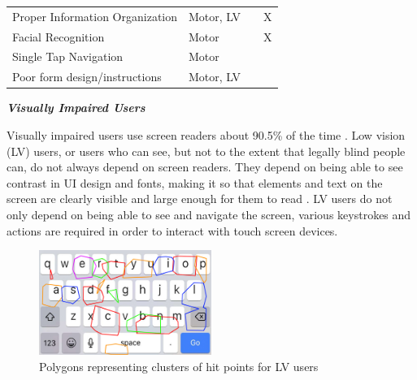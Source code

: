 \begin{table}[h]
\begin{tabular}{>{\centering\arraybackslash}p{2in}|>{\centering\arraybackslash}p{1.8in}|>{\centering\arraybackslash}p{.82in}|>{\centering\arraybackslash}p{.82in}}
		 Proper Information Organization & \footnotesize {Motor, LV} & \cite{Calvo16} & X \\
		\rowcolor{gray!30!} Facial Recognition & \footnotesize {Motor} & \cite{Calvo16, Astler11} & X \\
		 Single Tap Navigation & \footnotesize {Motor} & \cite{AppleAccess, GoogleAccess, HarvardAccess, WebGuide, FlrezAristizbal19, Milne18} &  \\
		\rowcolor{gray!30!} Poor form design/instructions & \footnotesize {Motor, LV} & \cite{ADAWeb, AccessGov} &  
		\end{tabular}
\vspace{-1em}
	\label{tab:guidelines}
\end{table}



\noindent \textbf{\textit{Visually Impaired Users}}

Visually impaired users use screen readers about 90.5\% of the time \cite{Salehnamadi21}. Low vision (LV) users, or users who can see, but not to the extent that legally blind people can, do not always depend on screen readers. They depend on being able to see contrast in UI design and fonts, making it so that elements and text on the screen are clearly visible and large enough for them to read \cite{IOSDesign}. LV users do not only depend on being able to see and navigate the screen, various keystrokes and actions are required in order to interact with touch screen devices. 

\begin{figure}
    \centering
    \includegraphics[width=0.5\textwidth]{imgs/hits.jpg}
    \caption{Polygons representing clusters of hit points for LV users \cite{4}}
    \label{fig:HitPoint}
\end{figure}


